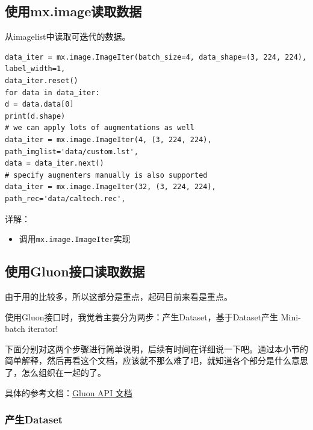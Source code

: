 \subsection{使用mx.image读取数据}

从imagelist中读取可迭代的数据。

\begin{lstlisting}
data_iter = mx.image.ImageIter(batch_size=4, data_shape=(3, 224, 224), label_width=1,
data_iter.reset()
for data in data_iter:
d = data.data[0]
print(d.shape)
# we can apply lots of augmentations as well
data_iter = mx.image.ImageIter(4, (3, 224, 224), path_imglist='data/custom.lst',
data = data_iter.next()
# specify augmenters manually is also supported
data_iter = mx.image.ImageIter(32, (3, 224, 224), path_rec='data/caltech.rec',
\end{lstlisting}

详解：
\begin{itemize}
\item 调用\verb|mx.image.ImageIter|实现
\end{itemize}

\subsection{使用Gluon接口读取数据}

由于用的比较多，所以这部分是重点，起码目前来看是重点。

使用Gluon接口时，我觉着主要分为两步：产生Dataset，基于Dataset产生 Mini-batch iterator!

下面分别对这两个步骤进行简单说明，后续有时间在详细说一下吧。通过本小节的简单解释，然后再看这个文档，应该就不那么难了吧，就知道各个部分是什么意思了，怎么组织在一起的了。

具体的参考文档：\href{https://mxnet.incubator.apache.org/api/python/gluon/data.html}{Gluon API 文档}

\subsubsection{产生Dataset}


